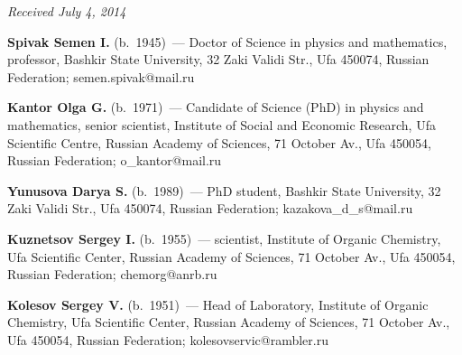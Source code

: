 \vspace*{-3pt}

\hfill{\small\textit{Received July 4, 2014}}



     \Contr

     \noindent
     \textbf{Spivak Semen I.} (b.\ 1945)~--- Doctor
     of Science in physics and mathematics, professor, Bashkir
State University, 32 Zaki Validi Str., Ufa 450074, Russian Federation; semen.spivak@mail.ru

\vspace*{3pt}

\noindent
\textbf{Kantor Olga G.} (b.\ 1971)~--- Candidate of Science (PhD) in physics and mathematics, senior
scientist, Institute of Social and Economic Research, Ufa Scientific Centre, Russian Academy of Sciences,
71 October Av., Ufa 450054, Russian Federation; o\_kantor@mail.ru

\vspace*{3pt}

\noindent
\textbf{Yunusova Darya S.} (b.\ 1989)~---  PhD student, Bashkir State University, 32 Zaki Validi Str., Ufa
450074, Russian Federation; kazakova\_d\_s@mail.ru

\vspace*{3pt}

\noindent
\textbf{Kuznetsov Sergey I.} (b.\ 1955)~--- scientist, Institute of Organic Chemistry, Ufa Scientific Center,
Russian Academy of Sciences, 71 October Av., Ufa 450054, Russian Federation; chemorg@anrb.ru

\vspace*{3pt}

\noindent
\textbf{Kolesov Sergey V.} (b.\ 1951)~--- Head of Laboratory, Institute of Organic Chemistry, Ufa
Scientific Center, Russian Academy of Sciences, 71 October Av., Ufa 450054, Russian Federation;
kolesovservic@rambler.ru

\label{end\stat}

\renewcommand{\bibname}{\protect\rm Литература}
